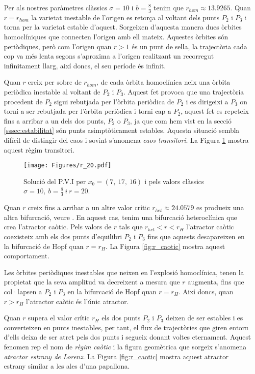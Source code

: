 \documentclass[11pt,a4paper,openright,oneside]{article}
\numberwithin{equation}{section}
\theoremstyle{definition}
\begin{document}
Per als nostres paràmetres clàssics $\sigma=10$ i $b=\frac{8}{3}$ tenim que $r_{hom}\approx 13.9265$. Quan $r=r_{hom}$ la varietat inestable de l'origen es retorça al voltant dels punts $P_2$ i $P_3$ i torna per la varietat estable d'aquest. Sorgeixen d'aquesta manera dues òrbites homoclíniques que connecten l'origen amb ell mateix. Aquestes òrbites són periòdiques, però com l'origen quan $r>1$ és un punt de sella, la trajectòria cada cop va més lenta segons s'aproxima a l'origen realitzant un recorregut infinitament llarg, així doncs, el seu període és infinit.

Quan $r$ creix per sobre de $r_{hom}$, de cada òrbita homoclínica neix una òrbita periòdica inestable al voltant de $P_2$ i $P_3$. Aquest fet provoca que una trajectòria procedent de $P_2$ sigui rebutjada per l'òrbita periòdica de $P_2$ i es dirigeixi a $P_3$ on torni a ser rebutjada per l'òrbita periòdica i torni cap a $P_2$, aquest fet es repeteix fins a arribar a un dels dos punts, $P_2$ o $P_3$, ja que com hem vist en la secció \ref{sssec:estabilitat} són punts asimptòticament estables. Aquesta situació sembla difícil de distingir del caos i sovint s'anomena \textit{caos transitori}. La Figura \ref{fig:r_20} mostra aquest règim transitori.

\begin{figure}[htbp]
    \centering
    \texttt{[image: Figures/r\_20.pdf]}
    \caption{Solució del P.V.I per $x_0=(7, \ 17, \ 16)$ i pels valors clàssics $\sigma = 10, \ b=\frac{8}{3} \ i \ r=20$.}
    \label{fig:r_20}
\end{figure}

Quan $r$ creix fins a arribar a un altre valor crític $r_{het}\approx24.0579$ es produeix una altra bifurcació, veure \cite{Heteroclinica}. En aquest cas, tenim una bifurcació heteroclínica que crea l'atractor caòtic. Pels valors de $r$ tals que $r_{het}<r<r_H$ l'atractor caòtic coexisteix amb els dos punts d'equilibri $P_2$ i $P_3$ fins que aquests desapareixen en la bifurcació de Hopf quan $r=r_{H}$. La Figura \ref{fig:r_caotic} mostra aquest comportament.

Les òrbites periòdiques inestables que neixen en l'explosió homoclínica, tenen la propietat que la seva amplitud va decreixent a mesura que $r$ augmenta, fins que col·lapsen a $P_2$ i $P_3$ en la bifurcació de Hopf quan $r=r_H$. Així doncs, quan $r>r_H$ l'atractor caòtic és l'únic atractor.

Quan $r$ supera el valor crític $r_H$ els dos punts $P_2$ i $P_3$ deixen de ser estables i es converteixen en punts inestables, per tant, el flux de trajectòries que giren entorn d'ells deixa de ser atret pels dos punts i segueix donant voltes eternament. Aquest fenomen rep el nom de \textit{règim caòtic} i la figura geomètrica que sorgeix s'anomena \textit{atractor estrany de Lorenz}. La Figura \ref{fig:r_caotic} mostra aquest atractor estrany similar a les ales d'una papallona.
\end{document}
